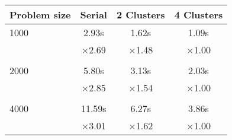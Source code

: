 \centering\begin{tabular}{l*{3}{c}}
\toprule
Problem size & Serial & 2 Clusters & 4 Clusters\\\midrule
1000 &   2.93s &   1.62s &   1.09s \\    
 &  $\times$2.69 &  $\times$1.48 &  $\times$1.00 \\ \\
2000 &   5.80s &   3.13s &   2.03s \\    
 &  $\times$2.85 &  $\times$1.54 &  $\times$1.00 \\ \\
4000 &  11.59s &   6.27s &   3.86s \\    
 &  $\times$3.01 &  $\times$1.62 &  $\times$1.00 \\
\bottomrule
\end{tabular}
